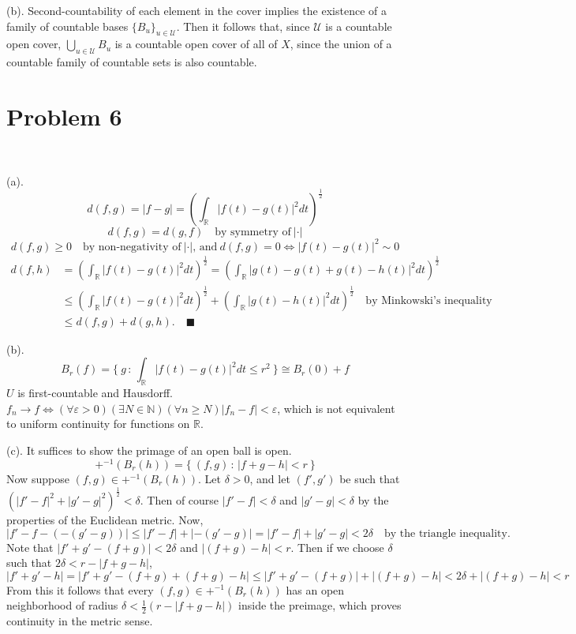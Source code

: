 \documentclass{article}
\begin{document}
(b). Second-countability of each element in the cover implies the existence of a family of countable bases $\{B_u\}_{u\in\mathcal{U}}$.
Then it follows that, since $\mathcal{U}$ is a countable open cover, $\bigcup_{u\in\mathcal{U}}B_u$ is a countable open cover of all of $X$,
since the union of a countable family of countable sets is also countable.

\section{Problem 6}\,

(a). $$d(f, g)=|f-g|=\left(\int_\mathbb{R}|f(t)-g(t)|^2dt\right)^{\frac{1}{2}}$$
$$ d(f, g)=d(g, f)\quad\text{by symmetry of}\ |\cdot|$$
$$d(f, g)\geq 0\quad\text{by non-negativity of}\ |\cdot|\text{, and}\ d(f, g)=0\iff|f(t)-g(t)|^2\sim0$$
\begin{align*}
	d(f, h) & = \left(\int_\mathbb{R}|f(t)-g(t)|^2dt\right)^\frac{1}{2}=\left(\int_\mathbb{R}|g(t)-g(t)+g(t)-h(t)|^2dt\right)^\frac{1}{2}                               \\
	        & \leq \left(\int_\mathbb{R}|f(t)-g(t)|^2dt\right)^\frac{1}{2}+\left(\int_\mathbb{R}|g(t)-h(t)|^2dt\right)^\frac{1}{2}\quad\text{by Minkowski's inequality} \\
	        & \leq d(f, g) + d(g, h).\quad\blacksquare
\end{align*}

(b). $$B_r(f)=\{\ g\,:\,\int_\mathbb{R}|f(t)-g(t)|^2dt\leq r^2\ \}\cong B_r(0)+f$$
$U$ is first-countable and Hausdorff.\newline
$f_n\to f\iff(\forall\varepsilon>0)(\exists N\in \mathbb{N})(\forall n\geq N)|f_n-f|<\varepsilon$, which is not equivalent to uniform continuity for functions on $\mathbb{R}$.

(c). It suffices to show the primage of an open ball is open.
$$+^{-1}(B_r(h))=\{\ (f, g)\,:\,|f+g-h|<r\ \}$$
Now suppose $(f, g)\in+^{-1}(B_r(h))$. Let $\delta>0$, and let $(f', g')$ be such that $(|f'-f|^2+|g'-g|^2)^\frac{1}{2}<\delta$.\newline
Then of course $|f'-f|<\delta$ and $|g'-g|<\delta$ by the properties of the Euclidean metric. Now,
$$|f'-f-(-(g'-g))|\leq|f'-f|+|-(g'-g)|=|f'-f|+|g'-g|<2\delta\quad\text{by the triangle inequality.}$$
Note that $|f'+g'-(f+g)|<2\delta$ and $|(f+g)-h|<r$. Then if we choose $\delta$ such that $2\delta<r-|f+g-h|$,
$$|f'+g'-h|=|f'+g'-(f+g)+(f+g)-h|\leq|f'+g'-(f+g)|+|(f+g)-h|<2\delta+|(f+g)-h|<r$$
From this it follows that every $(f, g)\in+^{-1}(B_r(h))$ has an open neighborhood of radius $\delta<\frac{1}{2}(r-|f+g-h|)$ inside the preimage, which proves continuity in the metric sense.
\end{document}
